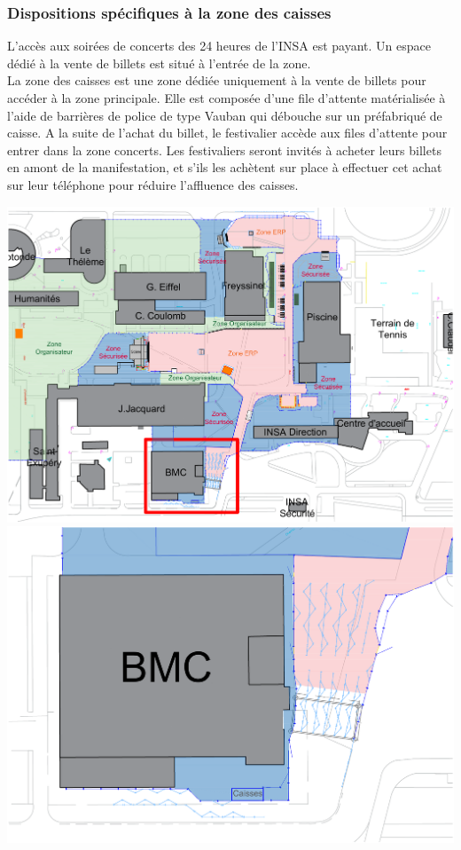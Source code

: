 \documentclass[hidelinks, paper=a4, fontsize=13pt]{report}
\begin{document}
\subsubsection{Dispositions spécifiques à la zone des caisses}
L’accès aux soirées de concerts des 24 heures de l’INSA est payant. Un espace dédié à la vente de billets est situé à l’entrée de la zone. \\
La zone des caisses est une zone dédiée uniquement à la vente de billets pour accéder à la zone principale. Elle est composée d'une file d’attente matérialisée à l’aide de barrières de police de type Vauban qui débouche sur un préfabriqué de caisse. A la suite de l'achat du billet, le festivalier accède aux files d'attente pour entrer dans la zone concerts. Les festivaliers seront invités à acheter leurs billets en amont de la manifestation, et s'ils les achètent sur place à effectuer cet achat sur leur téléphone pour réduire l'affluence des caisses.
\begin{center}
	\includegraphics[width=.8\textwidth,keepaspectratio]{Exports/Plan_24h_44eme-Entree}
	\includegraphics[width=.8\textwidth,keepaspectratio]{Exports/Plan_24h_44eme-Entree_zoom}
\end{center}
\end{document}
